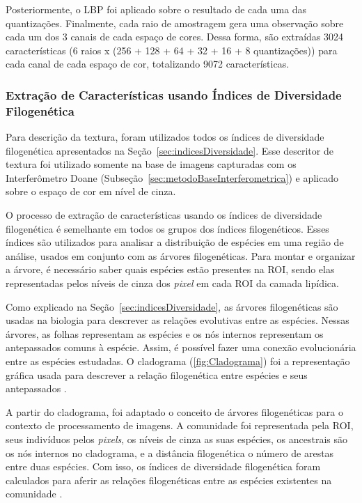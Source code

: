 Posteriormente, o LBP foi aplicado sobre o resultado de cada uma das quantizações. Finalmente, cada raio de amostragem gera uma observação sobre cada um dos 3 canais de cada espaço de cores. Dessa forma, são extraídas 3024 características (6 raios x (256 + 128 + 64 + 32 + 16 + 8 quantizações)) para cada canal de cada espaço de cor, totalizando 9072 características.

\subsubsection{Extração de Características usando Índices de Diversidade Filogenética}
\label{sec:metodoIndicesD}

Para descrição da textura, foram utilizados todos os índices de diversidade filogenética apresentados na Seção~\ref{sec:indicesDiversidade}. Esse descritor de textura foi utilizado somente na base de imagens capturadas com os Interferômetro Doane (Subseção~\ref{sec:metodoBaseInterferometrica}) e aplicado sobre o espaço de cor em nível de cinza.

O processo de extração de características usando os índices de diversidade filogenética é semelhante em todos os grupos dos índices filogenéticos. Esses índices são utilizados para analisar a distribuição de espécies em uma região de análise, usados em conjunto com as árvores filogenéticas. Para montar e organizar
a árvore, é necessário saber quais espécies estão presentes na ROI, sendo elas representadas pelos níveis de cinza dos \textit{pixel} em cada ROI da camada lipídica.

Como explicado na Seção~\ref{sec:indicesDiversidade}, as árvores filogenéticas são usadas na biologia para descrever as relações evolutivas entre as espécies. Nessas árvores, as folhas representam as espécies e os nós internos representam os antepassados comuns à espécie. Assim, é possível fazer uma conexão evolucionária entre as espécies estudadas. O cladograma (\autoref{fig:Cladograma}) foi a representação gráfica usada para descrever a relação filogenética entre espécies e seus antepassados \cite{vane1991protect}.

A partir do cladograma, foi adaptado o conceito de árvores filogenéticas para o contexto de processamento de imagens. A comunidade foi representada pela ROI, seus indivíduos pelos \textit{pixels}, os níveis de cinza as suas espécies, os ancestrais são os nós internos no cladograma, e a distância filogenética o número de arestas entre duas espécies. Com isso, os índices de diversidade filogenética foram calculados para aferir as relações filogenéticas entre as espécies
existentes na comunidade \cite{carvalho2016metodos,vane1991protect}.

